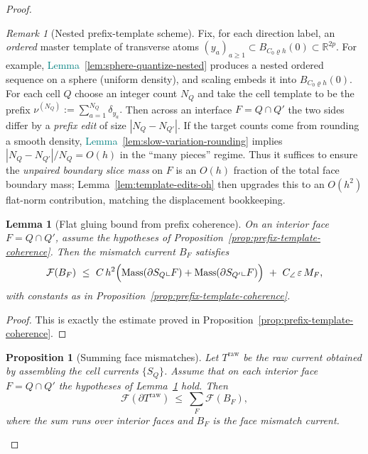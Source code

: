 \documentclass[11pt]{article}
\newcommand{\REVMZ}[1]{\textcolor{teal}{#1}}  %
\numberwithin{equation}{section}  %
\theoremstyle{plain}
\newtheorem{lemma}[theorem]{Lemma}
\newtheorem{proposition}[theorem]{Proposition}
\theoremstyle{definition}
\theoremstyle{remark}
\newtheorem{remark}[theorem]{Remark}
\newcommand{\R}{\mathbb{R}}
\DeclareMathOperator{\Mass}{Mass}
\begin{document}
\begin{proof}
\begin{remark}[Nested prefix-template scheme]\label{rem:nested-template-scheme}
Fix, for each direction label, an \emph{ordered} master template of transverse atoms $(y_a)_{a\ge 1}\subset B_{C_0\varrho h}(0)\subset\R^{2p}$.
For example, \REVMZ{Lemma~\ref{lem:sphere-quantize-nested}} produces a nested ordered sequence on a sphere (uniform density), and scaling embeds it into $B_{C_0\varrho h}(0)$.
For each cell $Q$ choose an integer count $N_Q$ and take the cell template to be the prefix
\(
\nu^{(N_Q)}:=\sum_{a=1}^{N_Q}\delta_{y_a}.
\)
Then across an interface $F=Q\cap Q'$ the two sides differ by a \emph{prefix edit} of size $|N_Q-N_{Q'}|$.
If the target counts come from rounding a smooth density, \REVMZ{Lemma~\ref{lem:slow-variation-rounding}} implies $|N_Q-N_{Q'}|/N_Q=O(h)$ in the ``many pieces'' regime.
Thus it suffices to ensure the \emph{unpaired boundary slice mass} on $F$ is an $O(h)$ fraction of the total face boundary mass; Lemma~\ref{lem:template-edits-oh}
then upgrades this to an $O(h^2)$ flat-norm contribution, matching the displacement bookkeeping.
\end{remark}







\begin{lemma}[Flat gluing bound from prefix coherence]\label{lem:sliver-template-glue-flat}
On an interior face $F=Q\cap Q'$, assume the hypotheses of Proposition~\ref{prop:prefix-template-coherence}.
Then the mismatch current $B_F$ satisfies
\[
\mathcal F(B_F)\ \le\ C\,h^2\Bigl(\Mass(\partial S_Q\llcorner F)+\Mass(\partial S_{Q'}\llcorner F)\Bigr)\ +\ C_{\angle}\,\varepsilon\,M_F,
\]
with constants as in Proposition~\ref{prop:prefix-template-coherence}.
\end{lemma}

\begin{proof}
This is exactly the estimate proved in Proposition~\ref{prop:prefix-template-coherence}.
\end{proof}


\begin{proposition}[Summing face mismatches]\label{prop:sliver-template-glue}
Let $T^{\mathrm{raw}}$ be the raw current obtained by assembling the cell currents $\{S_Q\}$.
Assume that on each interior face $F=Q\cap Q'$ the hypotheses of Lemma~\ref{lem:sliver-template-glue-flat} hold.
Then
\[
\mathcal F(\partial T^{\mathrm{raw}})\ \le\ \sum_{F}\mathcal F(B_F),
\]
where the sum runs over interior faces and $B_F$ is the face mismatch current.
\end{proposition}


\end{proof}
\end{document}
